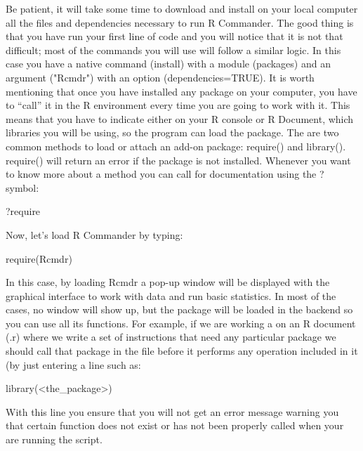 Be patient, it will take some time to download and install on your local computer all the files and dependencies necessary to run R Commander. The good thing is that you have run your first line of code and you will notice that it is not that difficult; most of the commands you will use will follow a similar logic. In this case you have a native command (install) with a module (packages) and an argument ("Rcmdr") with an option (dependencies=TRUE). It is worth mentioning that once you have installed any package on your computer, you have to “call” it in the R environment every time you are going to work with it. This means that you have to indicate either on your R console or R Document, which libraries you will be using, so the program can load the package. The are two common methods to load or attach an add-on package: require() and library(). require() will return an error if the package is not installed. Whenever you want to know more about a method you can call for documentation using the ? symbol:

\begin{exampler}
?require	
\end{exampler}

Now, let’s load R Commander by typing:

\begin{exampler}
require(Rcmdr)
\end{exampler}

In this case, by loading Rcmdr a pop-up window will be displayed with the graphical interface to work with data and run basic statistics. In most of the cases, no window will show up, but the package will be loaded in the backend so you can use all its functions. For example, if we are working a on an R document (.r) where we write a set of instructions that need any particular package we should call that package in the file before it performs any operation included in it (by just entering a line such as:

\begin{terminal}
library(<the_package>)
\end{terminal}

With this line you ensure that you will not get an error message warning you that certain function does not exist or has not been properly called when your are running the script.

